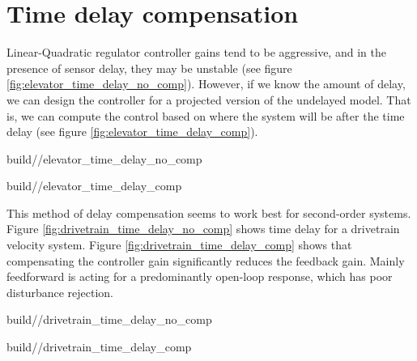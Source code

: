 \section{Time delay compensation}

Linear-Quadratic regulator controller gains tend to be aggressive, and in the
presence of sensor delay, they may be unstable (see figure
\ref{fig:elevator_time_delay_no_comp}). However, if we know the amount of delay,
we can design the controller for a projected version of the undelayed model.
That is, we can compute the control based on where the system will be after the
time delay (see figure \ref{fig:elevator_time_delay_comp}).
\begin{bookfigure}
  \begin{minisvg}{2}{build/\chapterpath/elevator_time_delay_no_comp}
    \caption{Elevator response at 5ms sample period with 50ms of output lag
      (uncompensated controller gains)}
    \label{fig:elevator_time_delay_no_comp}
  \end{minisvg}
  \hfill
  \begin{minisvg}{2}{build/\chapterpath/elevator_time_delay_comp}
    \caption{Elevator response at 5ms sample period with 50ms of output lag
      (compensated controller gains)}
    \label{fig:elevator_time_delay_comp}
  \end{minisvg}
\end{bookfigure}

This method of delay compensation seems to work best for second-order systems.
Figure \ref{fig:drivetrain_time_delay_no_comp} shows time delay for a drivetrain
velocity system. Figure \ref{fig:drivetrain_time_delay_comp} shows that
compensating the controller gain significantly reduces the feedback gain. Mainly
feedforward is acting for a predominantly open-loop response, which has poor
disturbance rejection.
\begin{bookfigure}
  \begin{minisvg}{2}{build/\chapterpath/drivetrain_time_delay_no_comp}
    \caption{Drivetrain response at 1ms sample period with 40ms of output lag
      (uncompensated controller gain)}
    \label{fig:drivetrain_time_delay_no_comp}
  \end{minisvg}
  \hfill
  \begin{minisvg}{2}{build/\chapterpath/drivetrain_time_delay_comp}
    \caption{Drivetrain response at 1ms sample period with 40ms of output lag
      (compensated controller gain)}
    \label{fig:drivetrain_time_delay_comp}
  \end{minisvg}
\end{bookfigure}

